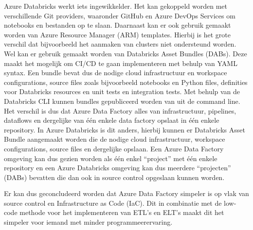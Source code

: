 Azure Databricks werkt iets ingewikkelder. Het kan gekoppeld worden met verschillende Git providers, waaronder GitHub en Azure DevOps Services om notebooks en bestanden op te slaan. Daarnaast kan er ook gebruik gemaakt worden van Azure Resource Manager (ARM) templates. Hierbij is het grote verschil dat bijvoorbeeld het aanmaken van clusters niet ondersteund worden. Wel kan er gebruik gemaakt worden van Databricks Asset Bundles (DABs). Deze maakt het mogelijk om CI/CD te gaan implementeren met behulp van YAML syntax. Een bundle bevat dus de nodige cloud infrastructuur en workspace configurations, source files zoals bijvoorbeeld notebooks en Python files, definities voor Databricks resources en unit tests en integration tests. Met behulp van de Databricks CLI kunnen bundles gepubliceerd worden van uit de command line.\\

Het verschil is dus dat Azure Data Factory alles van infrastructuur, pipelines, dataflows en dergelijke van één enkele data factory opslaat in één enkele repository. In Azure Databricks is dit anders, hierbij kunnen er Databricks Asset Bundle aangemaakt worden die de nodige cloud infrastructuur, workspace configurations, source files en dergelijke opslaan. Een Azure Data Factory omgeving kan dus gezien worden als één enkel ``project'' met één enkele repository en een Azure Databricks omgeving kan dus meerdere ``projecten'' (DABs) bevatten die dan ook in source control opgeslaan kunnen worden.

Er kan dus geconcludeerd worden dat Azure Data Factory simpeler is op vlak van source control en Infrastructure as Code (IaC). Dit in combinatie met de low-code methode voor het implementeren van ETL's en ELT's maakt dit het simpeler voor iemand met minder programmeerervaring.

